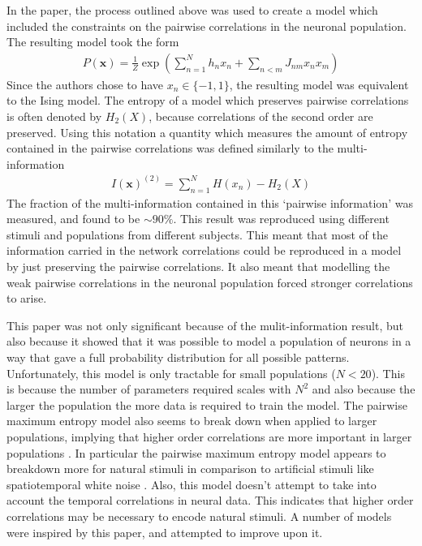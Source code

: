 \documentclass[a4paper,12pt]{article}
\theoremstyle{definition}
\begin{document}
	In the paper, the process outlined above was used to create a model which included the constraints on the pairwise correlations in the neuronal population. The resulting model took the form
	\begin{align}
	P(\mathbf{x}) = \frac{1}{Z}\exp \left( \sum_{n=1}^N h_n x_n + \sum_{n<m} J_{nm} x_n x_m \right)
	\end{align}
	Since the authors chose to have $x_n \in \lbrace -1, 1 \rbrace$, the resulting model was equivalent to the Ising model. The entropy of a model which preserves pairwise correlations is often denoted by $H_2(X)$, because correlations of the second order are preserved. Using this notation a quantity which measures the amount of entropy contained in the pairwise correlations was defined similarly to the multi-information
	\begin{align}
	I(\mathbf{x})^{(2)} = \sum_{n=1}^N H(x_n) - H_2(X)
	\end{align}
	The fraction of the multi-information contained in this `pairwise information' was measured, and found to be $\sim 90\%$. This result was reproduced using different stimuli and populations from different subjects. This meant that most of the information carried in the network correlations could be reproduced in a model by just preserving the pairwise correlations. It also meant that modelling the weak pairwise correlations in the neuronal population forced stronger correlations to arise. 
	
	This paper was not only significant because of the mulit-information result, but also because it showed that it was possible to model a population of neurons in a way that gave a full probability distribution for all possible patterns. Unfortunately, this model is only tractable for small populations ($N < 20$). This is because the number of parameters required scales with $N^2$ and also because the larger the population the more data is required to train the model. The pairwise maximum entropy model also seems to break down when applied to larger populations, implying that higher order correlations are more important in larger populations \cite{schwartz}. In particular the pairwise maximum entropy model appears to breakdown more for natural stimuli in comparison to artificial stimuli like spatiotemporal white noise \cite{ganmor}. Also, this model doesn't attempt to take into account the temporal correlations in neural data. This indicates that higher order correlations may be necessary to encode natural stimuli. A number of models were inspired by this paper, and attempted to improve upon it.
	
\end{document}
